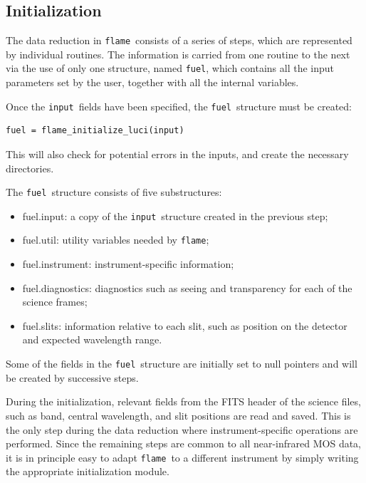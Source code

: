 \documentclass[a4paper, notitlepage]{article}
\newcommand{\flame}{\texttt{flame}}
\newcommand{\fuel}{\texttt{fuel}}
\newcommand{\inp}{\texttt{input}}
\begin{document}




\subsection{Initialization}

The data reduction in \flame\ consists of a series of steps, which are represented by individual routines. The information is carried from one routine to the next via the use of only one structure, named \fuel, which contains all the input parameters set by the user, together with all the internal variables.

Once the \inp\ fields have been specified, the \fuel\ structure must be created:
\begin{lstlisting}
fuel = flame_initialize_luci(input)
\end{lstlisting}
This will also check for potential errors in the inputs, and create the necessary directories.

The \fuel\ structure consists of five substructures:
\begin{itemize}
	\item fuel.input: a copy of the \inp\ structure created in the previous step;
	\item fuel.util: utility variables needed by \flame;
	\item fuel.instrument: instrument-specific information;
	\item fuel.diagnostics: diagnostics such as seeing and transparency for each of the science frames;
	\item fuel.slits: information relative to each slit, such as position on the detector and expected wavelength range.
\end{itemize}

Some of the fields in the \fuel\ structure are initially set to null pointers and will be created by successive steps.

During the initialization, relevant fields from the FITS header of the science files, such as band, central wavelength, and slit positions are read and saved. This is the only step during the data reduction where instrument-specific operations are performed. Since the remaining steps are common to all near-infrared MOS data, it is in principle easy to adapt \flame\ to a different instrument by simply writing the appropriate initialization module.
\end{document}
